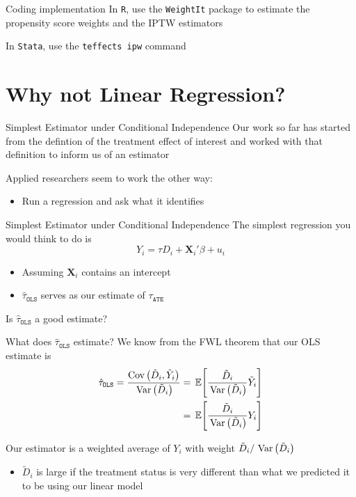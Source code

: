 \documentclass[aspectratio=169,t,11pt,table]{beamer}
\begin{document}
\begin{frame}{Coding implementation}
  In \texttt{R}, use the \texttt{WeightIt} package to estimate the propensity score weights and the IPTW estimators

  \bigskip
  In \texttt{Stata}, use the \texttt{teffects ipw} command
\end{frame}



\section{Why not Linear Regression?}

\begin{frame}{Simplest Estimator under Conditional Independence}
  Our work so far has started from the defintion of the treatment effect of interest and worked with that definition to inform us of an estimator

  \bigskip
  Applied researchers seem to work the other way:
  \begin{itemize}
    \item Run a regression and ask what it identifies
  \end{itemize}
\end{frame}

\begin{frame}{Simplest Estimator under Conditional Independence}
  The simplest regression you would think to do is 
  $$
    Y_i = \tau D_i + \bm{X}_i' \beta + u_i
  $$
  \begin{itemize}
    \item Assuming $\bm{X}_i$ contains an intercept

    \item $\hat{\tau}_{\texttt{OLS}}$ serves as our estimate of $\tau_{\texttt{ATE}}$
  \end{itemize}

  \bigskip 
  Is $\hat{\tau}_{\texttt{OLS}}$ a good estimate?
\end{frame}

\begin{frame}{What does $\hat{\tau}_{\texttt{OLS}}$ estimate?}
  We know from the FWL theorem that our OLS estimate is 
  \begin{align*}
    \hat{\tau}_{\texttt{OLS}} 
    = \frac{\cov{\tilde{D}_i, \tilde{Y}_i}}{\var{\tilde{D}_i}} 
    &= \expec{\frac{\tilde{D}_i}{\var{\tilde{D}_i}} \tilde{Y}_i} \\
    &= \expec{\frac{\tilde{D}_i}{\var{\tilde{D}_i}} Y_i}
  \end{align*}
  
  \pause
  Our estimator is a weighted average of $Y_i$ with weight $\tilde{D}_i / \var{\tilde{D}_i}$
  \begin{itemize}
    \item $\tilde{D}_i$ is large if the treatment status is very different than what we predicted it to be using our linear model
  \end{itemize}
\end{frame}
\end{document}
